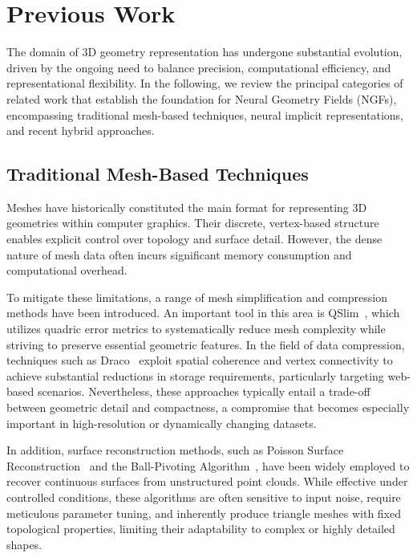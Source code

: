\section{Previous Work}\label{sec:PreviousWork}
The domain of 3D geometry representation has undergone substantial evolution, driven by the ongoing need to balance precision, computational efficiency, and representational flexibility.
In the following, we review the principal categories of related work that establish the foundation for Neural Geometry Fields (NGFs), encompassing traditional mesh-based techniques, neural implicit representations, and recent hybrid approaches.

\subsection{Traditional Mesh-Based Techniques}
Meshes have historically constituted the main format for representing 3D geometries within computer graphics.
Their discrete, vertex-based structure enables explicit control over topology and surface detail.
However, the dense nature of mesh data often incurs significant memory consumption and computational overhead.

To mitigate these limitations, a range of mesh simplification and compression methods have been introduced.
An important tool in this area is QSlim~\cite{garland1997surface}, which utilizes quadric error metrics to systematically reduce mesh complexity while striving to preserve essential geometric features.
In the field of data compression, techniques such as Draco~\cite{sajnani2020draco} exploit spatial coherence and vertex connectivity to achieve substantial reductions in storage requirements, particularly targeting web-based scenarios.
Nevertheless, these approaches typically entail a trade-off between geometric detail and compactness, a compromise that becomes especially important in high-resolution or dynamically changing datasets.

In addition, surface reconstruction methods, such as Poisson Surface Reconstruction~\cite{kazhdan2006poisson} and the Ball-Pivoting Algorithm~\cite{bernardini1999ball}, have been widely employed to recover continuous surfaces from unstructured point clouds.
While effective under controlled conditions, these algorithms are often sensitive to input noise, require meticulous parameter tuning, and inherently produce triangle meshes with fixed topological properties, limiting their adaptability to complex or highly detailed shapes.

